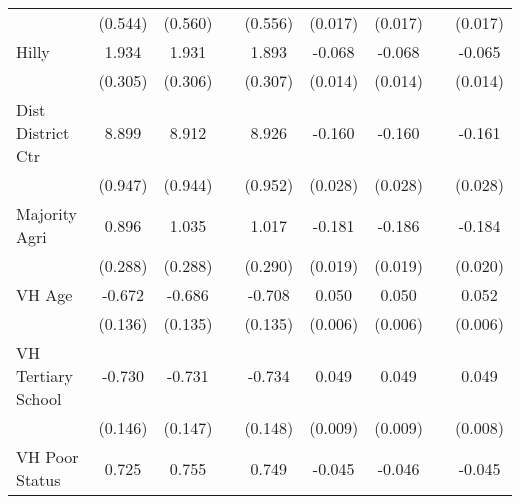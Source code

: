 {\begin{tabular}{l*{8}{c}}
                    &     (0.544)        &     (0.560)        &                    &     (0.556)        &     (0.017)        &     (0.017)        &                    &     (0.017)        \\
Hilly               &       1.934\sym{**}&       1.931\sym{**}&                    &       1.893\sym{**}&      -0.068\sym{**}&      -0.068\sym{**}&                    &      -0.065\sym{**}\\
                    &     (0.305)        &     (0.306)        &                    &     (0.307)        &     (0.014)        &     (0.014)        &                    &     (0.014)        \\
Dist District Ctr   &       8.899\sym{**}&       8.912\sym{**}&                    &       8.926\sym{**}&      -0.160\sym{**}&      -0.160\sym{**}&                    &      -0.161\sym{**}\\
                    &     (0.947)        &     (0.944)        &                    &     (0.952)        &     (0.028)        &     (0.028)        &                    &     (0.028)        \\
Majority Agri       &       0.896\sym{**}&       1.035\sym{**}&                    &       1.017\sym{**}&      -0.181\sym{**}&      -0.186\sym{**}&                    &      -0.184\sym{**}\\
                    &     (0.288)        &     (0.288)        &                    &     (0.290)        &     (0.019)        &     (0.019)        &                    &     (0.020)        \\
VH Age              &      -0.672\sym{**}&      -0.686\sym{**}&                    &      -0.708\sym{**}&       0.050\sym{**}&       0.050\sym{**}&                    &       0.052\sym{**}\\
                    &     (0.136)        &     (0.135)        &                    &     (0.135)        &     (0.006)        &     (0.006)        &                    &     (0.006)        \\
VH Tertiary School  &      -0.730\sym{**}&      -0.731\sym{**}&                    &      -0.734\sym{**}&       0.049\sym{**}&       0.049\sym{**}&                    &       0.049\sym{**}\\
                    &     (0.146)        &     (0.147)        &                    &     (0.148)        &     (0.009)        &     (0.009)        &                    &     (0.008)        \\
VH Poor Status      &       0.725        &       0.755        &                    &       0.749        &      -0.045\sym{**}&      -0.046\sym{**}&                    &      -0.045\sym{**}\\

\end{tabular}}
